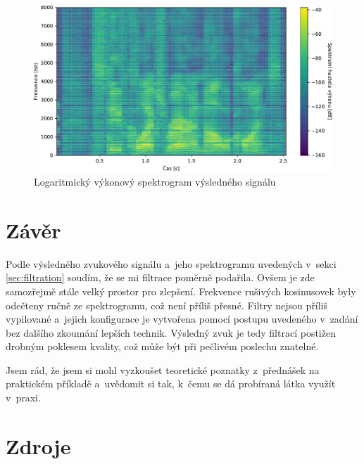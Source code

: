 \documentclass[a4paper, 11pt, final]{article}
\begin{document}
\begin{figure}[ht]
    \centering
    \includegraphics[width=\textwidth]{img/10-final-spectrogram.pdf}
    \caption{Logaritmický výkonový spektrogram výsledného signálu}
    \label{fig:filtered-signal-spectrogram}
\end{figure}

\section{Závěr}
\label{sec:end}

Podle výsledného zvukového signálu a~jeho spektrogramu uvedených v~sekci \ref{sec:filtration} soudím, že se mi filtrace poměrně podařila. Ovšem je zde samozřejmě stále velký prostor pro zlepšení. Frekvence rušivých kosinusovek byly odečteny ručně ze spektrogramu, což není příliš přesné. Filtry nejsou příliš vypilované a~jejich konfigurace je vytvořena pomocí postupu uvedeného v~zadání bez dalšího zkoumání lepších technik. Výsledný zvuk je tedy filtrací postižen drobným poklesem kvality, což může být při pečlivém poslechu znatelné.

Jsem rád, že jsem si mohl vyzkoušet teoretické poznatky z~přednášek na praktickém příkladě a~uvědomit si tak, k~čemu se dá probíraná látka využít v~praxi.

\newpage

\section*{Zdroje}
    
    
\end{document}
